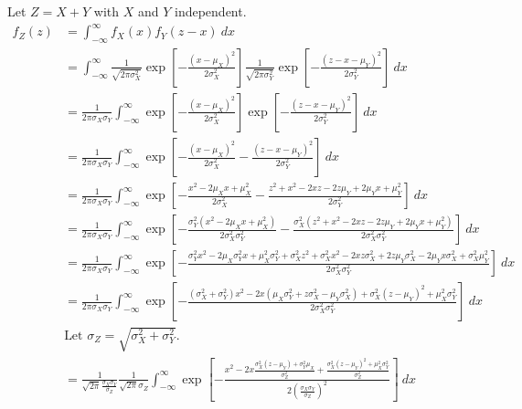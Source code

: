 \documentclass[twoside]{article}
\numberwithin{equation}{section}
\numberwithin{figure}{section}
\begin{document}
Let $Z = X + Y$ with $X$ and $Y$ independent.
{
  \allowdisplaybreaks
\begin{align*}
  f_Z(z) &= \int_{-\infty}^{\infty} f_X(x) f_Y(z - x) \: dx \\
  &= \int_{-\infty}^{\infty} \frac{1}{\sqrt{2 \pi \sigma_X^2}} \exp \left[{-\frac{(x - \mu_X)^2}{2 \sigma_X^2}} \right] \frac{1}{\sqrt{2 \pi \sigma_Y^2}} \exp \left[{-\frac{(z - x - \mu_Y)^2}{2 \sigma_Y^2}} \right] \: dx \\[10pt]
  &= \frac{1}{2 \pi \sigma_X \sigma_Y} \int_{-\infty}^{\infty} \exp \left[{-\frac{(x - \mu_X)^2}{2 \sigma_X^2}} \right] \exp \left[{-\frac{(z - x - \mu_Y)^2}{2 \sigma_Y^2}} \right] \: dx \\[10pt]
  &= \frac{1}{2 \pi \sigma_X \sigma_Y} \int_{-\infty}^{\infty} \exp\left[{-\frac{(x - \mu_X)^2}{2 \sigma_X^2} - \frac{(z - x - \mu_Y)^2}{2 \sigma_Y^2}} \right] \: dx \\[10pt]
  &= \frac{1}{2 \pi \sigma_X \sigma_Y} \int_{-\infty}^{\infty} \exp\left[{-\frac{x^2 - 2 \mu_X x + \mu_X^2}{2 \sigma_X^2} - \frac{z^2 + x^2 - 2 x z - 2 z \mu_Y + 2 \mu_Y x + \mu_Y^2}{2 \sigma_Y^2}} \right] \: dx \\[10pt]
  &= \frac{1}{2 \pi \sigma_X \sigma_Y} \int_{-\infty}^{\infty} \exp\left[{-\frac{\sigma_Y^2(x^2 - 2 \mu_X x + \mu_X^2)}{2 \sigma_X^2 \sigma_Y^2} - \frac{\sigma_X^2(z^2 + x^2 - 2 x z - 2 z \mu_Y + 2 \mu_Y x + \mu_Y^2)}{2 \sigma_X^2 \sigma_Y^2 }} \right] \: dx \\[10pt]
  &= \frac{1}{2 \pi \sigma_X \sigma_Y} \int_{-\infty}^{\infty} \exp\left[{-\frac{\sigma_Y^2 x^2 - 2 \mu_X \sigma_Y^2 x + \mu_X^2 \sigma_Y^2 + \sigma_X^2 z^2 + \sigma_X^2 x^2 - 2xz\sigma_X^2 + 2 z \mu_Y \sigma_X^2 - 2\mu_Y x \sigma_X^2 + \sigma_X^2 \mu_Y^2}{2 \sigma_X^2 \sigma_Y^2}} \right] \: dx \\[10pt]
  &= \frac{1}{2 \pi \sigma_X \sigma_Y} \int_{-\infty}^{\infty} \exp\left[{-\frac{\left(\sigma_X^2 + \sigma_Y^2\right) x^2 - 2 x \left( \mu_X \sigma_Y^2 + z \sigma_X^2 - \mu_Y \sigma_X^2 \right) + \sigma_X^2 \left( z - \mu_Y \right)^2 + \mu_X^2 \sigma_Y^2}{2 \sigma_X^2 \sigma_Y^2}} \right] \: dx \\[10pt]
  &\text{Let $\sigma_Z = \sqrt{\sigma_X^2 + \sigma_Y^2}$}. \\
  &= \frac{1}{\sqrt{2 \pi} \frac{\sigma_X \sigma_Y}{\sigma_Z}} \frac{1}{\sqrt{2 \pi} \sigma_Z} \int_{-\infty}^{\infty} \exp\left[{-\frac{x^2 - 2x \frac{\sigma_X^2 (z - \mu_Y) + \sigma_Y^2 \mu_X}{\sigma_Z^2} + \frac{\sigma_X^2 \left( z - \mu_Y \right)^2 + \mu_X^2 \sigma_Y^2}{\sigma_Z^2}}{2 \left(\frac{\sigma_X \sigma_Y}{\sigma_Z}\right)^2}} \right] \: dx \\[10pt]

\end{align*}}
\end{document}
